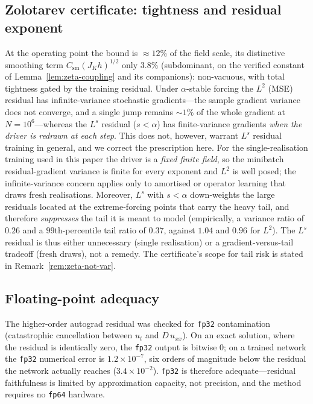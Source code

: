 \documentclass[review,12pt]{elsarticle}
\begin{document}
\subsection{Zolotarev certificate: tightness and residual exponent}
At the operating point the bound is $\approx 12\%$ of the field scale,
its distinctive smoothing term $C_{\mathrm{sm}}(J_K h)^{1/2}$ only
$3.8\%$ (subdominant, on the verified constant of
Lemma~\ref{lem:zeta-coupling} and its companions): non-vacuous, with
total tightness gated by the training residual. Under $\alpha$-stable
forcing the $L^2$ (MSE) residual has infinite-variance stochastic
gradients---the sample gradient variance does not converge, and a single
jump remains $\sim 1\%$ of the whole gradient at $N = 10^6$---whereas the
$L^s$ residual ($s < \alpha$) has finite-variance gradients \emph{when the
driver is redrawn at each step}. This does not, however, warrant $L^s$
residual training in general, and we correct the prescription here. For the
single-realisation training used in this paper the driver is a \emph{fixed
finite field}, so the minibatch residual-gradient variance is finite for
every exponent and $L^2$ is well posed; the infinite-variance concern applies
only to amortised or operator learning that draws fresh realisations.
Moreover, $L^s$ with $s < \alpha$ down-weights the large residuals located at
the extreme-forcing points that carry the heavy tail, and therefore
\emph{suppresses} the tail it is meant to model (empirically, a variance ratio
of $0.26$ and a $99$th-percentile tail ratio of $0.37$, against $1.04$ and
$0.96$ for $L^2$). The $L^s$ residual is thus either unnecessary (single
realisation) or a gradient-versus-tail tradeoff (fresh draws), not a remedy.
The certificate's scope for tail risk is stated in
Remark~\ref{rem:zeta-not-var}.

\subsection{Floating-point adequacy}
The higher-order autograd residual was checked for \texttt{fp32}
contamination (catastrophic cancellation between $u_t$ and $D\,u_{xx}$).
On an exact solution, where the residual is identically zero, the
\texttt{fp32} output is bitwise $0$; on a trained network the
\texttt{fp32} numerical error is $1.2\times10^{-7}$, six orders of
magnitude below the residual the network actually reaches
($3.4\times10^{-2}$). \texttt{fp32} is therefore adequate---residual
faithfulness is limited by approximation capacity, not precision, and
the method requires no \texttt{fp64} hardware.
\end{document}
